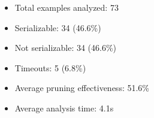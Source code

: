 \begin{itemize}
\item Total examples analyzed: 73
\item Serializable: 34 (46.6\%)
\item Not serializable: 34 (46.6\%)
\item Timeouts: 5 (6.8\%)
\item Average pruning effectiveness: 51.6\%
\item Average analysis time: 4.1s
\end{itemize}
